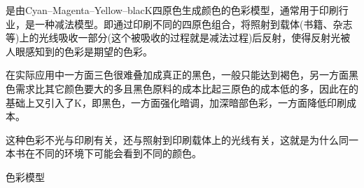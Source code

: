 \begin{example}[CMYK色彩模型]
  \CMYK{}是由{\color{cyan}Cyan}--{\color{magenta}Magenta}--{\color{yellow}Yellow}--{\color{black}blacK}四原色生成颜色的色彩模型，通常用于印刷行业，是一种减法模型。即通过印刷不同的四原色组合，将照射到载体(书籍、杂志等)上的光线吸收一部分(这个被吸收的过程就是减法过程)后反射，使得反射光被人眼感知到的色彩是期望的色彩。

  在实际应用中一方面\CMY{}三色很难叠加成真正的黑色，一般只能达到褐色，另一方面黑色需求比其它颜色要大的多且黑色原料的成本比起\CMY{}三原色的成本低的多，因此在\CMY{}的基础上又引入了K，即黑色，一方面强化暗调，加深暗部色彩，一方面降低印刷成本。

  这种色彩不光与印刷有关，还与照射到印刷载体上的光线有关，这就是为什么同一本书在不同的环境下可能会看到不同的颜色。
\end{example}

\begin{example}[HSV色彩模型]
  
\end{example}

\begin{definition}[YUV]
  
\end{definition}

\begin{definition}[色域]
  
\end{definition}

\begin{definition}
  色彩模型
\end{definition}

\begin{example}[sRGB色彩空间]
  
\end{example}

\begin{example}
  
\end{example}

\begin{definition}[绝对色彩空间]
  
\end{definition}


